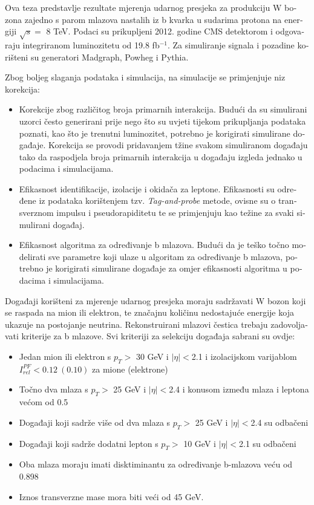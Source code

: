 \begin{otherlanguage}{croatian}
Ova teza predstavlje rezultate mjerenja udarnog presjeka za produkciju W bozona zajedno s parom mlazova nastalih iz b kvarka u sudarima protona na energiji $\sqrt{s}=$ 8 TeV. Podaci su prikupljeni 2012. godine CMS detektorom i odgovaraju integriranom luminozitetu od 19.8 fb$^{-1}$. Za simuliranje signala i pozadine korišteni su generatori Madgraph, Powheg i Pythia. 
\par Zbog boljeg slaganja podataka i simulacija, na simulacije se primjenjuje niz korekcija:
\begin{itemize}
\item Korekcije zbog različitog broja primarnih interakcija. Budući da su simulirani uzorci često generirani prije nego što su uvjeti tijekom prikupljanja podataka poznati, kao što je trenutni luminozitet, potrebno je korigirati simulirane događaje. Korekcija se provodi pridavanjem tžine svakom simuliranom događaju tako da raspodjela broja primarnih interakcija u događaju izgleda jednako u podacima i simulacijama.
\item Efikasnost identifikacije, izolacije i okidača za leptone. Efikasnosti su određene iz podataka korištenjem tzv. \textit{Tag-and-probe} metode, ovisne su o transverznom impulsu i pseudorapiditetu te se primjenjuju kao težine za svaki simulirani događaj.
\item Efikasnost algoritma za određivanje b mlazova. Budući da je teško točno modelirati sve parametre koji ulaze u algoritam za određivanje b mlazova, potrebno je korigirati simulirane događaje za omjer efikasnosti algoritma u podacima i simulacijama.
\end{itemize}
\par Događaji korišteni za mjerenje udarnog presjeka moraju sadržavati W bozon koji se raspada na mion ili elektron, te značajnu količinu nedostajuće energije koja ukazuje na postojanje neutrina. Rekonstruirani mlazovi čestica trebaju zadovoljavati kriterije za b mlazove. Svi kriteriji za selekciju događaja sabrani su ovdje:
\begin{itemize}
\item Jedan mion ili elektron s $p_T>$ 30 GeV i $|\eta|<$2.1  i izolacijskom varijablom $I_{rel}^{PF}<0.12\ (0.10)$ za mione (elektrone)
\item Točno dva mlaza s $p_T>$ 25 GeV i $|\eta|<$2.4 i konusom između mlaza i leptona većom od 0.5
\item Događaji koji sadrže više od dva mlaza s $p_T>$ 25 GeV i $|\eta|<$2.4 su odbačeni
\item Događaji koji sadrže dodatni lepton s $p_T>$ 10 GeV i $|\eta|<$2.1 su odbačeni
\item Oba mlaza moraju imati disktiminantu za određivanje b-mlazova veću od 0.898
\item Iznos transverzne mase mora biti veći od 45 GeV.
\end{itemize}  


\end{otherlanguage}
